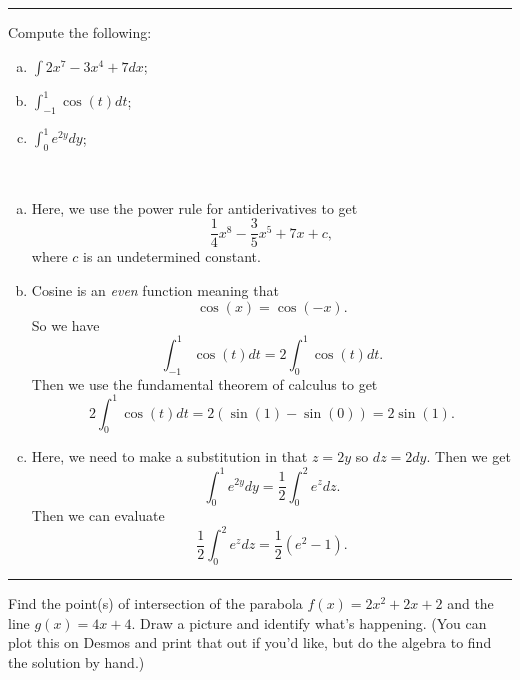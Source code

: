 \documentclass[12pt]{article} %
\begin{document}
\hrule

\begin{problem}
    Compute the following:
\begin{enumerate}[(a)]
    \item $\displaystyle{\int 2x^7-3x^4+7dx}$;
    \item $\displaystyle{\int_{-1}^1 \cos(t) dt}$;
    \item $\displaystyle{\int_0^1 e^{2y}dy}$;
\end{enumerate}
\end{problem}

\begin{solution}
~
\begin{enumerate}[(a)]
    \item Here, we use the power rule for antiderivatives to get
    \[
    \frac{1}{4} x^8 - \frac{3}{5} x^5 + 7x + c,
    \]
    where $c$ is an undetermined constant.
    \item Cosine is an \emph{even} function meaning that
    \[
    \cos(x)=\cos(-x).
    \]
    So we have
    \[
    \int_{-1}^1 \cos(t) dt = 2\int_0^1 \cos(t)dt.
    \]
    Then we use the fundamental theorem of calculus to get
    \[
    2\int_0^1 \cos(t)dt = 2 ( \sin(1)-\sin(0))=2\sin(1).
    \]
    \item Here, we need to make a substitution in that $z=2y$ so $dz=2dy$. Then we get
    \[
    \int_0^1 e^{2y}dy = \frac{1}{2} \int_0^2e^{z}dz.
    \]
    Then we can evaluate
    \[
    \frac{1}{2}\int_0^2 e^z dz = \frac{1}{2}\left(e^2-1\right).
    \]
\end{enumerate}
\end{solution}

\hrule

\begin{problem}
    Find the point(s) of intersection of the parabola $f(x)=2x^2+2x+2$ and the line $g(x)=4x+4$. Draw a picture and identify what's happening. (You can plot this on Desmos and print that out if you'd like, but do the algebra to find the solution by hand.)
\end{problem}
\end{document}

